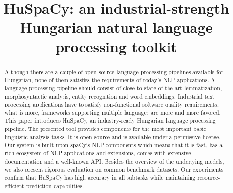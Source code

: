 \documentclass{llncs}
\newcommand{\huspacy}{HuSpaCy}
\begin{document}


\title{\huspacy: an industrial-strength Hungarian natural language processing toolkit}

\maketitle

\begin{abstract}
Although there are a couple of open-source language processing pipelines available for Hungarian, none of them satisfies the requirements of today’s NLP applications. A language processing pipeline should consist of close to state-of-the-art lemmatization, morphosyntactic analysis, entity recognition and word embeddings. 
Industrial text processing applications have to satisfy non-functional software quality requirements, what is more, frameworks supporting multiple languages are more and more favored.
This paper introduces \huspacy, an industry-ready Hungarian language processing pipeline. The presented tool provides components for the most important basic linguistic analysis tasks. It is open-source and is available under a permissive license. Our system is built upon spaCy’s NLP components which means that it is fast, has a rich ecosystem of NLP applications and extensions, comes with extensive documentation and a well-known API. Besides the overview of the underlying models, we also present rigorous evaluation on common benchmark datasets. Our experiments confirm that HuSpaCy has high accuracy in all subtasks while maintaining resource-efficient prediction capabilities. 
\end{abstract}
\end{document}
